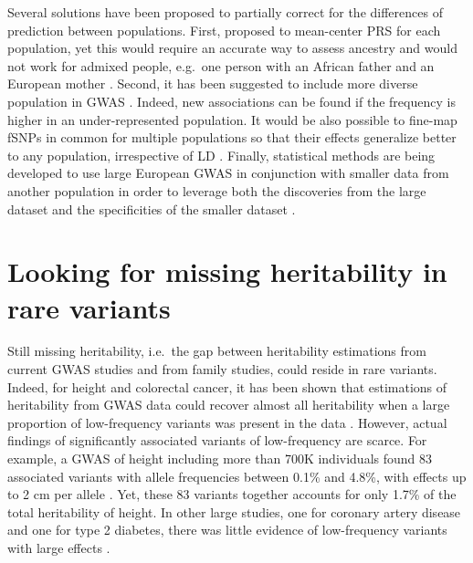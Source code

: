 Several solutions have been proposed to partially correct for the differences of prediction between populations. First, \cite{martin2017human} proposed to mean-center PRS for each population, yet this would require an accurate way to assess ancestry and would not work for admixed people, e.g.\ one person with an African father and an European mother \cite[]{reisberg2017comparing}.
Second, it has been suggested to include more diverse population in GWAS \cite[]{pulit2010multiethnic}. Indeed, new associations can be found if the frequency is higher in an under-represented population. 
It would be also possible to fine-map fSNPs in common for multiple populations so that their effects generalize better to any population, irrespective of LD \cite[]{carlson2013generalization,finemap,wojcik2018page}.
Finally, statistical methods are being developed to use large European GWAS in conjunction with smaller data from another population in order to leverage both the discoveries from the large dataset and the specificities of the smaller dataset \cite[]{marquez2017multiethnic,coram2017leveraging}.


\section{Looking for missing heritability in rare variants}

Still missing heritability, i.e.\ the gap between heritability estimations from current GWAS studies and from family studies, could reside in rare variants.
Indeed, for height and colorectal cancer, it has been shown that estimations of heritability from GWAS data could recover almost all heritability when a large proportion of low-frequency variants was present in the data \cite[]{yang2015genetic,huyghe2019discovery,wainschtein2019recovery}.
However, actual findings of significantly associated variants of low-frequency are scarce. 
For example, a GWAS of height including more than 700K individuals found 83 associated variants with allele frequencies between 0.1\% and 4.8\%, with effects up to 2 cm per allele \cite[]{marouli2017rare}. Yet, these 83 variants together accounts for only 1.7\% of the total heritability of height. 
In other large studies, one for coronary artery disease and one for type 2 diabetes, there was little evidence of low-frequency variants with large effects \cite[]{nikpay2015comprehensive,fuchsberger2016genetic}.


